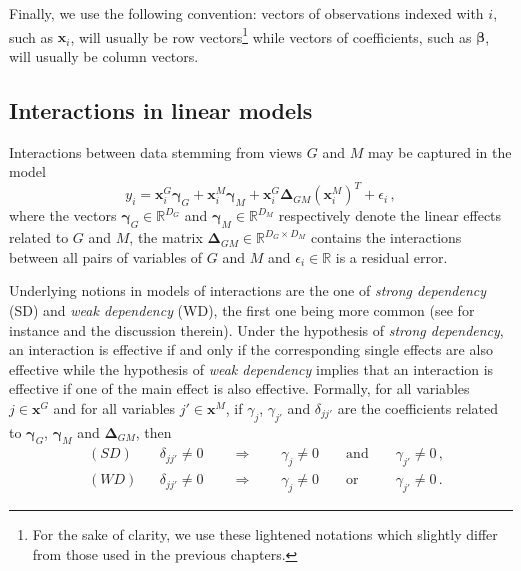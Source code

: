 \documentclass[]{book}
\begin{document}
Finally, we use the following convention: vectors of observations
indexed with \(i\), such as \(\mathbf{x}_i\), will usually be row vectors\footnote{For the sake of clarity, we use these lightened notations which
  slightly differ from those used in the previous chapters.} while
vectors of coefficients, such as \(\boldsymbol{\beta}\), will usually be column
vectors.

\hypertarget{interactions-in-linear-models}{%
\subsection{Interactions in linear models}\label{interactions-in-linear-models}}

Interactions between data stemming from views \(\mathit{G}\) and \(\mathit{M}\) may be
captured in the model \[\label{eq:classical_interaction_model}
  y_i =   \mathbf{x}^{\mathit{G}}_i \boldsymbol{\gamma}_{\mathit{G}}   
  + \mathbf{x}^{\mathit{M}}_i \boldsymbol{\gamma}_{\mathit{M}}  
  + \mathbf{x}^{\mathit{G}}_i \boldsymbol{\Delta}_{\mathit{G}\mathit{M}} (\mathbf{x}^{\mathit{M}}_i)^T  +
  \epsilon_i \,,\] where the vectors \(\boldsymbol{\gamma}_{\mathit{G}} \in \mathbb{R}^{D_{\mathit{G}}}\)
and \(\boldsymbol{\gamma}_{\mathit{M}} \in \mathbb{R}^{D_{\mathit{M}}}\) respectively denote the linear
effects related to \(\mathit{G}\) and \(\mathit{M}\), the matrix
\(\boldsymbol{\Delta}_{\mathit{G}\mathit{M}} \in \mathbb{R}^{D_{\mathit{G}} \times D_{\mathit{M}}}\) contains the
interactions between all pairs of variables of \(\mathit{G}\) and \(\mathit{M}\) and
\(\epsilon_i \in \mathbb{R}\) is a residual error.

Underlying notions in models of interactions are the one of \emph{strong dependency} (SD) and \emph{weak dependency} (WD), the first one being more common (see for instance \citep{bien2013lasso} and the discussion therein).
Under the hypothesis of \emph{strong dependency}, an interaction is effective
if and only if the corresponding single effects are also effective while
the hypothesis of \emph{weak dependency} implies that an interaction is
effective if one of the main effect is also effective. Formally, for all
variables \(j \in \mathbf{x}^{\mathit{G}}\) and for all variables \(j' \in \mathbf{x}^{\mathit{M}}\), if
\(\gamma_{j}\), \(\gamma_{j'}\) and \(\delta_{jj'}\) are the coefficients
related to \(\boldsymbol{\gamma}_{\mathit{G}}\), \(\boldsymbol{\gamma}_{\mathit{M}}\) and \(\boldsymbol{\Delta}_{\mathit{G}\mathit{M}}\), then
\[\begin{aligned}
  & (SD) &&  \delta_{jj'} \neq 0 \qquad \Rightarrow  \qquad
            \gamma_{j} 
            \neq 0 && \text{ and } && \gamma_{j'} \neq 0  \,, \\
  &  (WD) &&  \delta_{jj'} \neq 0 \qquad \Rightarrow  \qquad
             \gamma_{j} 
             \neq 0 && \text{ or } && \gamma_{j'} \neq 0  \,.\end{aligned}\]
\end{document}

